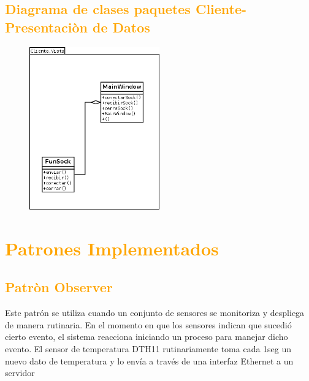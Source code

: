 \subsection{\textcolor{orange}{Diagrama de clases paquetes Cliente-Presentaciòn de Datos}}


\begin{figure}[h!]
 \begin{center}
  \includegraphics[width=0.5\textwidth,keepaspectratio=true]{img/Clases_Vista.png}
  \label{fig:esquema}
 \end{center}
\end{figure}



\section{\textcolor{orange}{Patrones Implementados}}
\subsection{\textcolor{orange}{Patròn Observer }}

Este patrón se utiliza cuando un conjunto de sensores se monitoriza y despliega de manera rutinaria. En el momento en que los sensores indican que sucedió cierto evento, el sistema reacciona iniciando un proceso para manejar dicho evento.
El sensor de temperatura DTH11 rutinariamente toma cada 1seg un nuevo dato de temperatura  y lo envía a través de una interfaz Ethernet a un servidor


